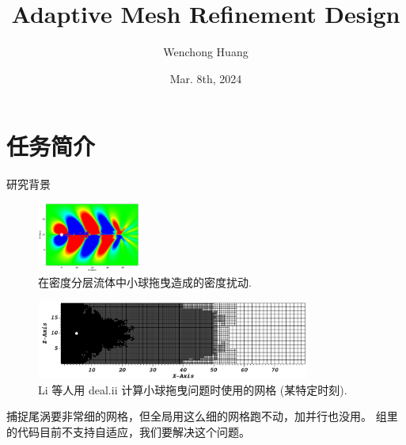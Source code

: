 \documentclass[10pt]{beamer}
\author{Wenchong Huang}
\title{Adaptive Mesh Refinement Design}
\institute{
    School of Mathematical Sciences, \\
    Zhejiang University.
}
\date{Mar. 8th, 2024}
\begin{document}
\begin{frame}
    \titlepage
\end{frame}

\section{任务简介}

\begin{frame}[fragile]{研究背景}
    \footnotesize

    \begin{figure}[H]
        \centering
        \includegraphics[width=0.3\textwidth]{png/densityPerturbation.png}
        \caption{\footnotesize 在密度分层流体中小球拖曳造成的密度扰动.}
    \end{figure}

    \vspace{-1em}

    \begin{figure}[H]
        \centering
        \includegraphics[width=0.8\textwidth]{png/amrdealii.png}
        \caption{\footnotesize Li 等人用 deal.ii 计算小球拖曳问题时使用的网格 (某特定时刻).}
    \end{figure}

    \vspace{-1em}

    捕捉尾涡要非常细的网格，但全局用这么细的网格跑不动，加并行也没用。
    组里的代码目前不支持自适应，我们要解决这个问题。
\end{frame}
\end{document}
